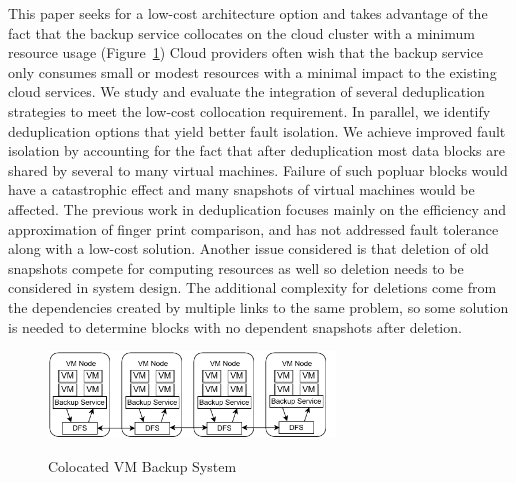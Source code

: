 This paper seeks for a low-cost architecture option and takes advantage of the
fact that the
backup service collocates on the cloud cluster with a minimum resource usage
(Figure~\ref{fig-colocated-arch})
Cloud providers often wish that the backup service only consumes  small or modest resources
with a minimal impact to the existing cloud services.  
We study and evaluate the integration of several deduplication strategies to meet
the low-cost collocation requirement. In parallel, we identify deduplication options that yield
better fault isolation.
We achieve improved fault isolation by accounting for the fact that after
deduplication most data blocks are shared by several to many virtual machines.
Failure of such popluar blocks would have a catastrophic effect and many
snapshots of virtual machines would be affected.
The previous work in deduplication focuses mainly on the efficiency and approximation of
finger print comparison, and has not addressed fault tolerance along with a low-cost solution.
Another issue considered is that
deletion of old snapshots compete for computing resources as well so deletion needs
to be considered in system design. The additional complexity for deletions
come from the dependencies created by multiple links to the same problem, so
some solution is needed to determine blocks with no dependent snapshots after deletion.

\begin{figure}[htb]
    \centering
    \includegraphics[width=3in]{images/colocated-arch.pdf}
    \label{fig-colocated-arch}
    \caption{Colocated VM Backup System}
\end{figure}

